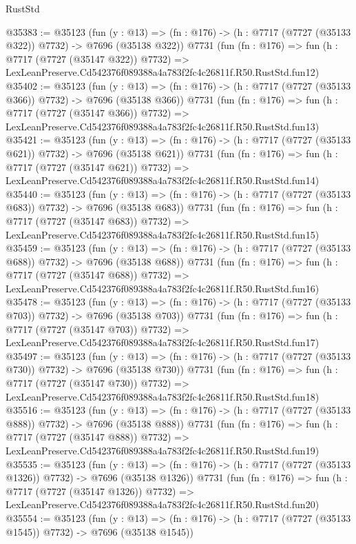 \begin{lexlean}{RustStd}
\begin{coremodule}
@35383 := @35123
    (fun (y : @13) => (fn : @176) -> (h : @7717 (@7727 (@35133 @322)) @7732) -> @7696 (@35138 @322))
    @7731
    (fun (fn : @176) =>
    fun (h : @7717 (@7727 (@35147 @322)) @7732) =>
    LexLeanPreserve.Cd542376f089388a4a783f2fc4c26811f.R50.RustStd.fun12)
@35402 := @35123
    (fun (y : @13) => (fn : @176) -> (h : @7717 (@7727 (@35133 @366)) @7732) -> @7696 (@35138 @366))
    @7731
    (fun (fn : @176) =>
    fun (h : @7717 (@7727 (@35147 @366)) @7732) =>
    LexLeanPreserve.Cd542376f089388a4a783f2fc4c26811f.R50.RustStd.fun13)
@35421 := @35123
    (fun (y : @13) => (fn : @176) -> (h : @7717 (@7727 (@35133 @621)) @7732) -> @7696 (@35138 @621))
    @7731
    (fun (fn : @176) =>
    fun (h : @7717 (@7727 (@35147 @621)) @7732) =>
    LexLeanPreserve.Cd542376f089388a4a783f2fc4c26811f.R50.RustStd.fun14)
@35440 := @35123
    (fun (y : @13) => (fn : @176) -> (h : @7717 (@7727 (@35133 @683)) @7732) -> @7696 (@35138 @683))
    @7731
    (fun (fn : @176) =>
    fun (h : @7717 (@7727 (@35147 @683)) @7732) =>
    LexLeanPreserve.Cd542376f089388a4a783f2fc4c26811f.R50.RustStd.fun15)
@35459 := @35123
    (fun (y : @13) => (fn : @176) -> (h : @7717 (@7727 (@35133 @688)) @7732) -> @7696 (@35138 @688))
    @7731
    (fun (fn : @176) =>
    fun (h : @7717 (@7727 (@35147 @688)) @7732) =>
    LexLeanPreserve.Cd542376f089388a4a783f2fc4c26811f.R50.RustStd.fun16)
@35478 := @35123
    (fun (y : @13) => (fn : @176) -> (h : @7717 (@7727 (@35133 @703)) @7732) -> @7696 (@35138 @703))
    @7731
    (fun (fn : @176) =>
    fun (h : @7717 (@7727 (@35147 @703)) @7732) =>
    LexLeanPreserve.Cd542376f089388a4a783f2fc4c26811f.R50.RustStd.fun17)
@35497 := @35123
    (fun (y : @13) => (fn : @176) -> (h : @7717 (@7727 (@35133 @730)) @7732) -> @7696 (@35138 @730))
    @7731
    (fun (fn : @176) =>
    fun (h : @7717 (@7727 (@35147 @730)) @7732) =>
    LexLeanPreserve.Cd542376f089388a4a783f2fc4c26811f.R50.RustStd.fun18)
@35516 := @35123
    (fun (y : @13) => (fn : @176) -> (h : @7717 (@7727 (@35133 @888)) @7732) -> @7696 (@35138 @888))
    @7731
    (fun (fn : @176) =>
    fun (h : @7717 (@7727 (@35147 @888)) @7732) =>
    LexLeanPreserve.Cd542376f089388a4a783f2fc4c26811f.R50.RustStd.fun19)
@35535 := @35123
    (fun (y : @13) =>
    (fn : @176) -> (h : @7717 (@7727 (@35133 @1326)) @7732) -> @7696 (@35138 @1326))
    @7731
    (fun (fn : @176) =>
    fun (h : @7717 (@7727 (@35147 @1326)) @7732) =>
    LexLeanPreserve.Cd542376f089388a4a783f2fc4c26811f.R50.RustStd.fun20)
@35554 := @35123
    (fun (y : @13) =>
    (fn : @176) -> (h : @7717 (@7727 (@35133 @1545)) @7732) -> @7696 (@35138 @1545))

\end{coremodule}
\end{lexlean}
